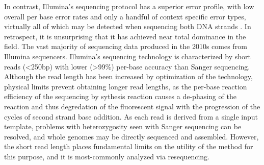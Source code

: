 In contrast, Illumina's sequencing protocol has a superior error profile, with low overall per base error rates and only a handful of context specific error types, virtually all of which may be detected when sequencing both DNA strands \cite{allhoff2013discovering}.
In retrospect, it is unsurprising that it has achieved near total dominance in the field.
The vast majority of sequencing data produced in the 2010s comes from Illumina sequencers.
Illumina's sequencing technology is characterized by short reads (<250bp) with lower (>99\%) per-base accuracy than Sanger sequencing.
Although the read length has been increased by optimization of the technology, physical limits prevent obtaining longer read lengths, as the per-base reaction efficiency of the sequencing by sythesis reaction causes a de-phasing of the reaction and thus degredation of the fluorescent signal with the progression of the cycles of second strand base addition.
As each read is derived from a single input template, problems with heterozygosity seen with Sanger sequencing can be resolved, and whole genomes may be directly sequenced and assembled.
However, the short read length places fundamental limits on the utility of the method for this purpose, and it is most-commonly analyzed via resequencing.

